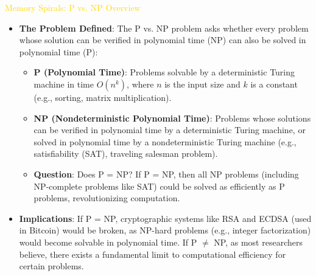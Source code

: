 \textcolor{gold}{ Memory Spirals: P vs. NP Overview } \\
\begin{itemize}
    \item \texttt{} \textbf{The Problem Defined}: The P vs. NP problem asks whether every problem whose solution can be verified in polynomial time (NP) can also be solved in polynomial time (P):
    \begin{itemize}
        \item \textbf{P (Polynomial Time)}: Problems solvable by a deterministic Turing machine in time \(O(n^k)\), where \(n\) is the input size and \(k\) is a constant (e.g., sorting, matrix multiplication).
        \item \textbf{NP (Nondeterministic Polynomial Time)}: Problems whose solutions can be verified in polynomial time by a deterministic Turing machine, or solved in polynomial time by a nondeterministic Turing machine (e.g., satisfiability (SAT), traveling salesman problem).
        \item \textbf{Question}: Does P = NP? If P = NP, then all NP problems (including NP-complete problems like SAT) could be solved as efficiently as P problems, revolutionizing computation.
    \end{itemize}
    \item \texttt{} \textbf{Implications}: If P = NP, cryptographic systems like RSA and ECDSA (used in Bitcoin) would be broken, as NP-hard problems (e.g., integer factorization) would become solvable in polynomial time. If P \(\neq\) NP, as most researchers believe, there exists a fundamental limit to computational efficiency for certain problems.
\end{itemize}

